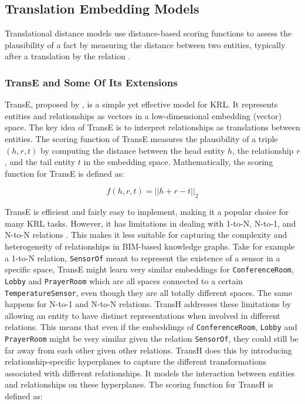 \subsection{Translation Embedding Models}
Translational distance models use distance-based scoring functions to assess the plausibility of a fact by measuring the distance between two entities, typically after a translation by the relation \cite{Wang2017KnowledgeApplications}.

\subsubsection{TransE and Some Of Its Extensions}
\label{translation-based models}
TransE, proposed by \cite{Bordes2013}, is a simple yet effective model for \ac{KRL}. It represents entities and relationships as vectors in a low-dimensional embedding (vector) space. The key idea of TransE is to interpret relationships as translations between entities. The scoring function of TransE measures the plausibility of a triple $(h, r, t)$ by computing the distance between the head entity \(h\), the relationship \(r\), and the tail entity \(t\) in the embedding space. Mathematically, the scoring function for TransE is defined as:

\begin{equation}   
    f(h, r, t) = ||h + r - t||_2
\end{equation}

TransE is efficient and fairly easy to implement, making it a popular choice for many \ac{KRL} tasks. However, it has limitations in dealing with 1-to-N, N-to-1, and N-to-N relations \citep{Wang2014KnowledgeHyperplanes, Lin2015LearningCompletion}. This makes it less suitable for capturing the complexity and heterogeneity of relationships in \ac{BIM}-based knowledge graphs. Take for example a 1-to-N relation, \texttt{SensorOf} meant to represent the existence of a sensor in a specific space, TransE might learn very similar embeddings for \texttt{ConferenceRoom}, \texttt{Lobby} and \texttt{PrayerRoom} which are all spaces connected to a certain \texttt{TemperatureSensor}, even though they are all totally different spaces. The same happens for N-to-1 and N-to-N
relations. TransH \citep{Wang2014KnowledgeHyperplanes} addresses these limitations by allowing an entity to have distinct representations when involved in
different relations. This means that even if the embeddings of \texttt{ConferenceRoom}, \texttt{Lobby} and \texttt{PrayerRoom} might be very similar given the relation \texttt{SensorOf}, they could still be far away from each other given other relations. TransH does this by introducing relationship-specific hyperplanes to capture the different transformations associated with different relationships. It models the interaction between entities and relationships on these hyperplanes. The scoring function for TransH is defined as:

